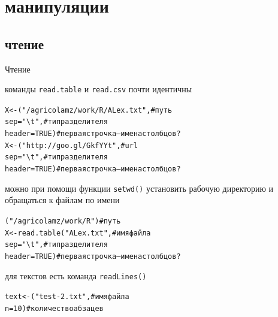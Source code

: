 \section{манипуляции}
\subsection{чтение}
\begin{frame}[fragile]{Чтение}
\begin{itemize}
\mytem команды \footnotesize \verb"read.table" \normalsize и \footnotesize \verb"read.csv" \normalsize почти идентичны
\footnotesize
\begin{alltt}
X <- {\color{red!13!blue}{read.table}}("/agricolamz/work/R/ALex.txt",  \hfill # путь
    sep = "\textbackslash{}t", \hfill # тип разделителя
    header = TRUE) \hfill # первая строчка — имена столбцов?\bigskip
X <- {\color{red!13!blue}{read.csv}}("http://goo.gl/GkfYYt", \hfill # url
    sep = "\textbackslash{}t", \hfill # тип разделителя
    header = TRUE) \hfill # первая строчка — имена столбцов?\bigskip
\end{alltt}
\normalsize
\mytem можно при помощи функции \footnotesize \verb"setwd()" \normalsize установить рабочую директорию и обращаться к файлам по имени
\footnotesize
\begin{alltt}
{\color{red!13!blue}{setwd}}("/agricolamz/work/R") \hfill # путь
X <- read.table("ALex.txt", \hfill  # имя файла
    sep = "\textbackslash{}t", \hfill # тип разделителя
    header = TRUE) \hfill # первая строчка — имена столбцов?\bigskip
\end{alltt}
\normalsize
\mytem для текстов есть команда \footnotesize \verb"readLines()" \normalsize
\footnotesize
\begin{alltt}
text <- {\color{red!13!blue}{readLines}}("test-2.txt", \hfill  # имя файла
    n = 10) \hfill # количество абзацев
\end{alltt}
\normalsize
\end{itemize}
\end{frame}
